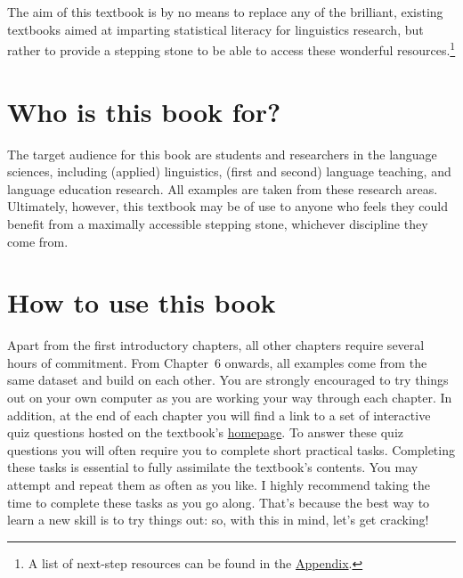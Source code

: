 \documentclass[
  letterpaper,
  DIV=11,
  numbers=noendperiod]{scrreprt}
\begin{document}
The aim of this textbook is by no means to replace any of the brilliant,
existing textbooks aimed at imparting statistical literacy for
linguistics research, but rather to provide a stepping stone to be able
to access these wonderful resources.\footnote{A list of next-step
  resources can be found in the
  \href{https://elenlefoll.github.io/RstatsTextbook/A_FurtherResources.html}{Appendix}.}

\section*{Who is this book for?}\label{who-is-this-book-for}


The target audience for this book are students and researchers in the
language sciences, including (applied) linguistics, (first and second)
language teaching, and language education research. All examples are
taken from these research areas. Ultimately, however, this textbook may
be of use to anyone who feels they could benefit from a maximally
accessible stepping stone, whichever discipline they come from.

\section*{How to use this book}\label{how-to-use-this-book-1}


Apart from the first introductory chapters, all other chapters require
several hours of commitment. From Chapter~6 onwards, all examples come
from the same dataset and build on each other. You are strongly
encouraged to try things out on your own computer as you are working
your way through each chapter. In addition, at the end of each chapter
you will find a link to a set of interactive quiz questions hosted on
the textbook's
\href{https://elenlefoll.github.io/RstatsTextbook}{homepage}. To answer
these quiz questions you will often require you to complete short
practical tasks. Completing these tasks is essential to fully assimilate
the textbook's contents. You may attempt and repeat them as often as you
like. I highly recommend taking the time to complete these tasks as you
go along. That's because the best way to learn a new skill is to try
things out: so, with this in mind, let's get cracking!
\end{document}
